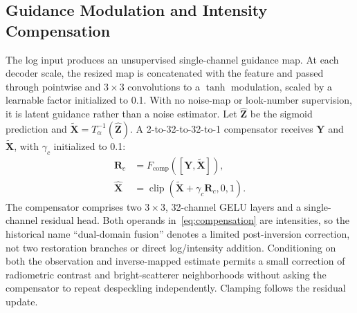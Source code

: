 \documentclass[conference]{IEEEtran}
\newcommand{\vect}[1]{\bm{#1}}
\begin{document}
\subsection{Guidance Modulation and Intensity Compensation}
The log input produces an unsupervised single-channel guidance map. At each decoder scale, the resized map is concatenated with the feature and passed through pointwise and \(3\times3\) convolutions to a \(\tanh\) modulation, scaled by a learnable factor initialized to 0.1. With no noise-map or look-number supervision, it is latent guidance rather than a noise estimator. Let \(\widehat{\vect{Z}}\) be the sigmoid prediction and \(\widetilde{\vect{X}}=T_{\alpha}^{-1}(\widehat{\vect{Z}})\). A 2-to-32-to-32-to-1 compensator receives \(\vect{Y}\) and \(\widetilde{\vect{X}}\), with \(\gamma_c\) initialized to 0.1:
\begin{equation}
\begin{aligned}
\vect{R}_{c} &= F_{\mathrm{comp}}
 ([\vect{Y},\widetilde{\vect{X}}]),\\
\widehat{\vect{X}} &= \operatorname{clip}
 (\widetilde{\vect{X}}+\gamma_c\vect{R}_{c},0,1).
\end{aligned}
\label{eq:compensation}
\end{equation}
The compensator comprises two \(3\times3\), 32-channel GELU layers and a single-channel residual head. Both operands in~\eqref{eq:compensation} are intensities, so the historical name ``dual-domain fusion'' denotes a limited post-inversion correction, not two restoration branches or direct log/intensity addition. Conditioning on both the observation and inverse-mapped estimate permits a small correction of radiometric contrast and bright-scatterer neighborhoods without asking the compensator to repeat despeckling independently. Clamping follows the residual update.
\end{document}

